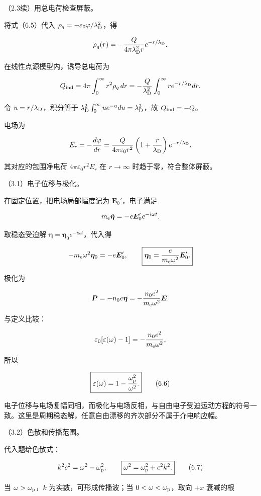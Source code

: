 \documentclass[12pt,a4paper,fontset=fandol]{ctexart}
\begin{document}
（2.3续）用总电荷检查屏蔽。

将式（6.5）代入 \(\rho_q=-\varepsilon_0\varphi/\lambda_{\rm D}^2\)，得

\[
\rho_q(r)=-\frac{Q}{4\pi\lambda_{\rm D}^2r}e^{-r/\lambda_{\rm D}}.
\]

在线性点源模型内，诱导总电荷为

\[
Q_{\rm ind}=4\pi\int_0^\infty r^2\rho_q\,dr
=-\frac{Q}{\lambda_{\rm D}^2}\int_0^\infty re^{-r/\lambda_{\rm D}}dr.
\]

令 \(u=r/\lambda_{\rm D}\)，积分等于
\(\lambda_{\rm D}^2\int_0^\infty ue^{-u}du=\lambda_{\rm D}^2\)，故
\(Q_{\rm ind}=-Q\)。

电场为

\[
E_r=-\frac{d\varphi}{dr}
=\frac{Q}{4\pi\varepsilon_0r^2}
\left(1+\frac r{\lambda_{\rm D}}\right)e^{-r/\lambda_{\rm D}}.
\]

其对应的包围净电荷 \(4\pi\varepsilon_0r^2E_r\) 在 \(r\to\infty\)
时趋于零，符合整体屏蔽。

（3.1）电子位移与极化。

在固定位置，把电场局部幅度记为 \(\boldsymbol E_0'\)，电子满足

\[
m_{\rm e}\ddot{\boldsymbol\eta}=-e\boldsymbol E_0'e^{-i\omega t}.
\]

取稳态受迫解 \(\boldsymbol\eta=\boldsymbol\eta_0e^{-i\omega t}\)，代入得

\[
-m_{\rm e}\omega^2\boldsymbol\eta_0=-e\boldsymbol E_0',
\qquad
\boxed{\boldsymbol\eta_0=\frac{e}{m_{\rm e}\omega^2}\boldsymbol E_0'.}
\]

极化为

\[
\boldsymbol P=-n_0e\boldsymbol\eta
=-\frac{n_0e^2}{m_{\rm e}\omega^2}\boldsymbol E.
\]

与定义比较：

\[
\varepsilon_0[\varepsilon(\omega)-1]
=-\frac{n_0e^2}{m_{\rm e}\omega^2},
\]

所以

\[
\boxed{\varepsilon(\omega)=1-\frac{\omega_{\rm p}^2}{\omega^2}.}
\tag{6.6}
\]

电子位移与电场复幅同相，而极化与电场反相，与自由电子受迫运动方程的符号一致。这里是周期稳态解，任意自由漂移的齐次部分不属于介电响应幅。

（3.2）色散和传播范围。

代入题给色散式：

\[
k^2c^2=\omega^2-\omega_{\rm p}^2,
\qquad
\boxed{\omega^2=\omega_{\rm p}^2+c^2k^2.}
\tag{6.7}
\]

当 \(\omega>\omega_{\rm p}\)，\(k\) 为实数，可形成传播波；当
\(0<\omega<\omega_{\rm p}\)，取向 \(+x\) 衰减的根
\end{document}
